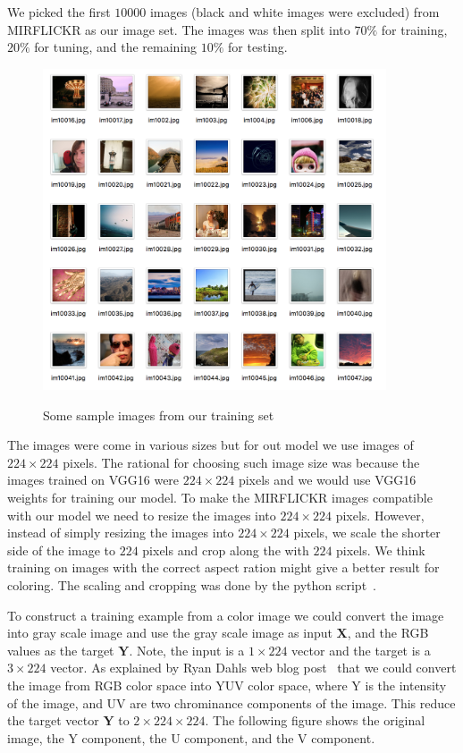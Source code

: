 \documentclass[12pt]{article}
\begin{document}
We picked the first $10000$ images (black and white images were excluded) from MIRFLICKR as our image set. The images was then split into $70\%$ for training, $20\%$ for tuning, and the remaining $10\%$ for testing. 

\begin{figure}[!ht]
 \centering
  \includegraphics[width=4.0in]{resource/exampleimages.png}
 \label{sampleimages}
 \caption{Some sample images from our training set}
\end{figure}


The images were come in various sizes but for out model we use images of $224\times224$ pixels. The rational for choosing such image size was because the images trained on VGG16 were $224\times224$ pixels and we would use VGG16 weights for training our model. To make the MIRFLICKR images compatible with our model we need to resize the images into $224\times224$ pixels. However, instead of simply resizing the images into $224\times224$ pixels, we scale the shorter side of the image to $224$ pixels and crop along the with $224$ pixels. We think training on images with the correct aspect ration might give a better result for coloring. The scaling and cropping was done by the python script~\cite{PYDATA}.

To construct a training example from a color image we could convert the image into gray scale image and use the gray scale image as input $\boldsymbol{X}$, and the RGB values as the target $\boldsymbol{Y}$. Note, the input is a $1\times224$ vector and the target is a $3\times224$ vector. As explained by Ryan Dahl\textquotesingle s web blog post~\cite{RYAN2016} that we could convert the image from RGB color space into YUV color space, where Y is the intensity of the image, and UV are two chrominance components of the image. This reduce the target vector $\boldsymbol{Y}$ to $2\times224\times224$. The following figure shows the original image, the Y component, the U component, and the V component. 
\end{document}
